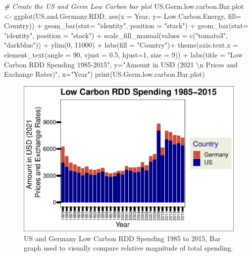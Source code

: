 \documentclass[
  12pt,
]{article}
\newenvironment{Shaded}{\begin{snugshade}}{\end{snugshade}}
\newcommand{\AttributeTok}[1]{\textcolor[rgb]{0.77,0.63,0.00}{#1}}
\newcommand{\CommentTok}[1]{\textcolor[rgb]{0.56,0.35,0.01}{\textit{#1}}}
\newcommand{\DecValTok}[1]{\textcolor[rgb]{0.00,0.00,0.81}{#1}}
\newcommand{\FloatTok}[1]{\textcolor[rgb]{0.00,0.00,0.81}{#1}}
\newcommand{\FunctionTok}[1]{\textcolor[rgb]{0.00,0.00,0.00}{#1}}
\newcommand{\NormalTok}[1]{#1}
\newcommand{\OtherTok}[1]{\textcolor[rgb]{0.56,0.35,0.01}{#1}}
\newcommand{\SpecialCharTok}[1]{\textcolor[rgb]{0.00,0.00,0.00}{#1}}
\newcommand{\StringTok}[1]{\textcolor[rgb]{0.31,0.60,0.02}{#1}}
\begin{document}
\begin{Shaded}
\begin{Highlighting}[]
\CommentTok{\# Create the US and Germ Low Carbon bar plot}
\NormalTok{US.Germ.low.carbon.Bar.plot }\OtherTok{\textless{}{-}} \FunctionTok{ggplot}\NormalTok{(US.and.Germany.RDD, }\FunctionTok{aes}\NormalTok{(}\AttributeTok{x =}\NormalTok{ Year, }\AttributeTok{y=}\NormalTok{ Low.Carbon.Energy, }\AttributeTok{fill=}\NormalTok{ Country)) }\SpecialCharTok{+}
  \FunctionTok{geom\_bar}\NormalTok{(}\AttributeTok{stat=} \StringTok{"identity"}\NormalTok{, }\AttributeTok{position =} \StringTok{"stack"}\NormalTok{) }\SpecialCharTok{+}
  \FunctionTok{geom\_bar}\NormalTok{(}\AttributeTok{stat=} \StringTok{"identity"}\NormalTok{, }\AttributeTok{position =} \StringTok{"stack"}\NormalTok{) }\SpecialCharTok{+}
  \FunctionTok{scale\_fill\_manual}\NormalTok{(}\AttributeTok{values =} \FunctionTok{c}\NormalTok{(}\StringTok{"tomato3"}\NormalTok{, }\StringTok{"darkblue"}\NormalTok{)) }\SpecialCharTok{+}
  \FunctionTok{ylim}\NormalTok{(}\DecValTok{0}\NormalTok{, }\DecValTok{11000}\NormalTok{) }\SpecialCharTok{+}
  \FunctionTok{labs}\NormalTok{(}\AttributeTok{fill =} \StringTok{"Country"}\NormalTok{)}\SpecialCharTok{+}
  \FunctionTok{theme}\NormalTok{(}\AttributeTok{axis.text.x =} \FunctionTok{element\_text}\NormalTok{(}\AttributeTok{angle =} \DecValTok{90}\NormalTok{, }\AttributeTok{vjust =} \FloatTok{0.5}\NormalTok{, }\AttributeTok{hjust=}\DecValTok{1}\NormalTok{, }\AttributeTok{size =} \DecValTok{9}\NormalTok{)) }\SpecialCharTok{+}
  \FunctionTok{labs}\NormalTok{(}\AttributeTok{title =} \StringTok{"Low Carbon RDD Spending 1985{-}2015"}\NormalTok{,}
       \AttributeTok{y=}\StringTok{"Amount in USD (2021 }\SpecialCharTok{\textbackslash{}n}\StringTok{ Prices and Exchange Rates)"}\NormalTok{,}
       \AttributeTok{x=}\StringTok{"Year"}\NormalTok{)}
\FunctionTok{print}\NormalTok{(US.Germ.low.carbon.Bar.plot)}
\end{Highlighting}
\end{Shaded}

\begin{figure}
\centering
\includegraphics{Chang_Jenkins_Mullens_ENV872_Final_files/figure-latex/US and Germ Low Carbon-1.pdf}
\caption{US and Germany Low Carbon RDD Spending 1985 to 2015, Bar graph
used to visually compare relative magnitude of total spending.}
\end{figure}
\end{document}

